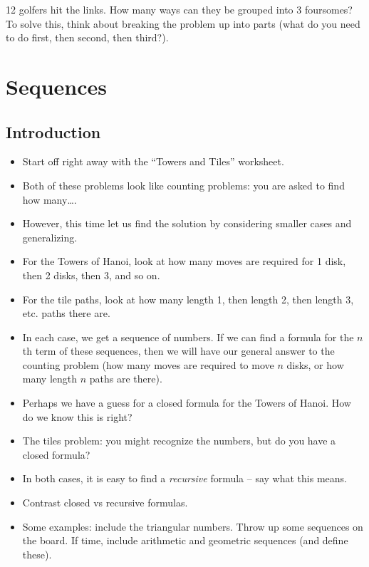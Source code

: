 \documentclass[12pt]{article}
\theoremstyle{plain}
\theoremstyle{definition}
\theoremstyle{remark}
\newcommand{\ex}{\noindent{\bf Ex: }}
\newcommand{\todayis}[1]{\clearpage{\rhead{\footnotesize #1}}}
\begin{document}
\begin{itemize}
	\ex 12 golfers hit the links.  How many ways can they be grouped into 3 foursomes?  To solve this, think about breaking the problem up into parts (what do you need to do first, then second, then third?).



\end{itemize}


\todayis{Wednesday, September 27}
\section*{Sequences}
\subsection*{Introduction}

\begin{itemize}
	\item Start off right away with the ``Towers and Tiles'' worksheet.
	\item Both of these problems look like counting problems: you are asked to find how many\ldots.
	\item However, this time let us find the solution by considering smaller cases and generalizing.
	\item For the Towers of Hanoi, look at how many moves are required for 1 disk, then 2 disks, then 3, and so on.
	\item For the tile paths, look at how many length 1, then length 2, then length 3, etc. paths there are.
	\item In each case, we get a sequence of numbers.  If we can find a formula for the $n$th term of these sequences, then we will have our general answer to the counting problem (how many moves are required to move $n$ disks, or how many length $n$ paths are there).
	\item Perhaps we have a guess for a closed formula for the Towers of Hanoi.  How do we know this is right?
	\item The tiles problem: you might recognize the numbers, but do you have a closed formula?
	\item In both cases, it is easy to find a {\em recursive} formula -- say what this means.
	\item Contrast closed vs recursive formulas.
	\item Some examples: include the triangular numbers.  Throw up some sequences on the board.  If time, include arithmetic and geometric sequences (and define these).
\end{itemize}
\end{document}
